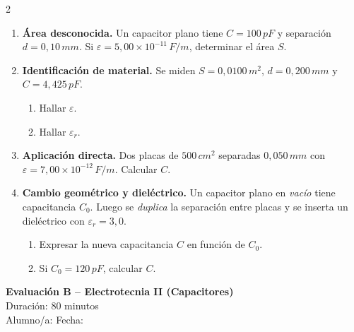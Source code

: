 \documentclass[a4paper,10pt]{article}
\begin{document}
\begin{multicols}{2}
\begin{enumerate}
\item \textbf{Área desconocida.} Un capacitor plano tiene \(C=100\,\si{pF}\) y separación \(d=0{,}10\,\si{mm}\). Si \(\varepsilon=5{,}00\times 10^{-11}\,\si{F/m}\), determinar el área \(S\).

\item \textbf{Identificación de material.} Se miden \(S=0{,}0100\,\si{m^2}\), \(d=0{,}200\,\si{mm}\) y \(C=4{,}425\,\si{pF}\).
\begin{enumerate}
\item Hallar \(\varepsilon\).
\item Hallar \(\varepsilon_r\).
\end{enumerate}

\item \textbf{Aplicación directa.} Dos placas de \(500\,\si{cm^2}\) separadas \(0{,}050\,\si{mm}\) con \(\varepsilon=7{,}00\times 10^{-12}\,\si{F/m}\). Calcular \(C\).

\item \textbf{Cambio geométrico y dieléctrico.} Un capacitor plano en \textit{vacío} tiene capacitancia \(C_0\).
Luego se \emph{duplica} la separación entre placas y se inserta un dieléctrico con \(\varepsilon_r=3{,}0\).
\begin{enumerate}
\item Expresar la nueva capacitancia \(C\) en función de \(C_0\).
\item Si \(C_0=120\,\si{pF}\), calcular \(C\).
\end{enumerate}

\end{enumerate}

\end{multicols}
\vspace{2cm}
\begin{center}
    \Large \textbf{Evaluación B – Electrotecnia II (Capacitores)} \\
    \normalsize Duración: 80 minutos \\
    Alumno/a: \underline{\hspace{6cm}} \hspace{0.5cm} Fecha: \underline{\hspace{2cm}}
\end{center}

\vspace{0.3cm}
\end{document}
